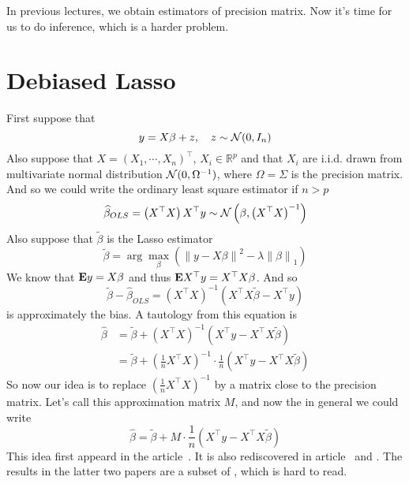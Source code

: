 \documentclass[12pt]{article}
\newcommand{\E}{{\bf E}}
\newcommand{\lam}{\lambda}
\newcommand{\R}{\mathbb R}
\newcommand{\calN}{{\cal N}}
\newcommand{\bra}[1]{\left(#1\right)}
\newcommand{\norm}[1]{\left\|#1\right\|}
\newcommand{\wh}[1]{\widehat{#1}}
\newcommand{\wt}[1]{\widetilde{#1}}
\def\beq{\begin{equation}}
\def\eeq{\end{equation}}
\def\beqal{\begin{equation}\begin{aligned}}
\def\eeqal{\end{aligned}\end{equation}}
\begin{document}
	\MakeScribeTop


In previous lectures, we obtain estimators of precision matrix. Now it's time for us to do inference, which is a harder problem.
\section{Debiased Lasso}
First suppose that 
\beq
y=X\beta +z,\quad z\sim \calN(0,I_n)
\eeq
Also suppose that $X=\bra{X_1,\cdots,X_n}^\top$, $X_i\in\R^p$ and that $X_i$ are i.i.d. drawn from multivariate normal distribution $\calN(0, \Omega^{-1})$, where $\Omega = \Sigma$ is the precision matrix. And so we could write the ordinary least square estimator if $n>p$
\beq
\wh{\beta}_{OLS}=\bra{X^\top X}X^\top y\sim \calN\bra{\beta, \bra{X^\top X}^{-1}}
\eeq
Also suppose that $\wt{\beta}$ is the Lasso estimator
\beq
\wt{\beta} = \arg\max_\beta \bra{\norm{y-X\beta}^2-\lam\norm{\beta}_1}
\eeq
We know that $\E y = X\beta$ and thus $\E X^\top y=X^\top X\beta$. And so
\beq
\wt{\beta}-\wh{\beta}_{OLS}=\bra{X^\top X}^{-1}\bra{X^\top X\wt{\beta}-X^\top y}
\eeq
is approximately the bias. A tautology from this equation is
\beqal
\wh{\beta}&=\wt{\beta}+\bra{X^\top X}^{-1}\bra{X^\top y-X^\top X\wt{\beta}}\\
&=\wt{\beta}+\bra{\frac{1}{n}X^\top X}^{-1}\cdot \frac{1}{n}\bra{X^\top y-X^\top X\wt{\beta}}
\eeqal
So now our idea is to replace $\bra{\frac{1}{n}X^\top X}^{-1}$ by a matrix close to the precision matrix. Let's call this approximation matrix $M$, and now the in general we could write
\beq
\wh{\beta}=\wt{\beta}+M\cdot \frac{1}{n}\bra{X^\top y-X^\top X\wt{\beta}}
\eeq
This idea first appeard in the article~\cite{zhang2011confidence}. It is also rediscovered in article~\cite{javanmard2015debiasing} and \cite{van_de_Geer_2014}. The results in the latter two papers are a subset of \cite{zhang2011confidence}, which is hard to read. 
\end{document}
